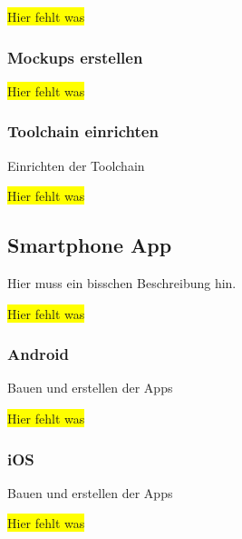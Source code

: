 \colorbox{yellow}{Hier fehlt was}

\subsubsection{Mockups erstellen}
\colorbox{yellow}{Hier fehlt was}

\subsubsection{Toolchain einrichten}
Einrichten der Toolchain

\colorbox{yellow}{Hier fehlt was}

\subsection{Smartphone App}
Hier muss ein bisschen Beschreibung hin.

\colorbox{yellow}{Hier fehlt was}

\subsubsection{Android}
Bauen und erstellen der Apps

\colorbox{yellow}{Hier fehlt was}

\subsubsection{iOS}
Bauen und erstellen der Apps

\colorbox{yellow}{Hier fehlt was}